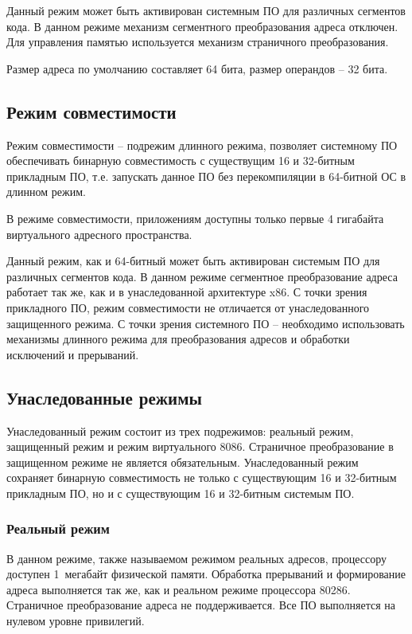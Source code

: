 Данный режим может быть активирован системным ПО для различных сегментов кода. В данном режиме
механизм сегментного преобразования адреса отключен. Для управления памятью используется
механизм страничного преобразования.

Размер адреса по умолчанию составляет 64 бита, размер операндов -- 32 бита.

\subsection{Режим совместимости}
Режим совместимости -- подрежим длинного режима, позволяет системному ПО обеспечивать
бинарную совместимость с существущим 16 и 32-битным прикладным ПО,
т.е. запускать данное ПО без перекомпиляции в 64-битной ОС в длинном режим.

В режиме совместимости, приложениям доступны только первые 4 гигабайта виртуального адресного пространства.

Данный режим, как и 64-битный может быть активирован системым ПО для различных сегментов кода.
В данном режиме сегментное преобразование адреса работает так же, как и в унаследованной
архитектуре x86. С точки зрения прикладного ПО, режим совместимости не отличается от унаследованного
защищенного режима. С точки зрения системного ПО -- необходимо использовать механизмы длинного режима для
преобразования адресов и обработки исключений и прерываний.

\subsection{Унаследованные режимы}
Унаследованный режим состоит из трех подрежимов: реальный режим, защищенный режим и режим виртуального 8086.
Страничное преобразование в защищенном режиме не является обязательным. Унаследованный режим сохраняет
бинарную совместимость не только с существующим 16 и 32-битным прикладным ПО, но и с существующим 16 и 32-битным
системым ПО.

\subsubsection*{Реальный режим}
В данном режиме, также называемом режимом реальных адресов, процессору доступен 1~мегабайт физической памяти.
Обработка прерываний и формирование адреса выполняется так же, как и реальном режиме процессора 80286.
Страничное преобразование адреса не поддерживается. Все ПО выполняется на нулевом уровне привилегий.

